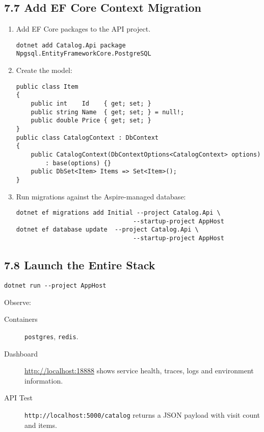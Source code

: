 \documentclass[table]{article}
\begin{document}
\subsection*{7.7 \faDatabase\enspace Add EF Core Context Migration}
\begin{enumerate}
  \item Add EF Core packages to the API project.  
\begin{verbatim}
dotnet add Catalog.Api package Npgsql.EntityFrameworkCore.PostgreSQL
\end{verbatim}
  \item Create the model:
\begin{verbatim}
public class Item
{
    public int    Id    { get; set; }
    public string Name  { get; set; } = null!;
    public double Price { get; set; }
}
public class CatalogContext : DbContext
{
    public CatalogContext(DbContextOptions<CatalogContext> options)
        : base(options) {}
    public DbSet<Item> Items => Set<Item>();
}
\end{verbatim}
  \item Run migrations against the Aspire-managed database:  
\begin{verbatim}
dotnet ef migrations add Initial --project Catalog.Api \
                                --startup-project AppHost
dotnet ef database update  --project Catalog.Api \
                                --startup-project AppHost
\end{verbatim}
\end{enumerate}

\subsection*{7.8 \faPlay\enspace Launch the Entire Stack}
\begin{verbatim}
dotnet run --project AppHost
\end{verbatim}
Observe:
\begin{description}
  \item[\faPlusCircle Containers] \texttt{postgres}, \texttt{redis}.
  \item[\faBug Dashboard]  \url{http://localhost:18888} shows service
        health, traces, logs and environment information.
  \item[\faEye API Test]  \verb|http://localhost:5000/catalog| returns a
        JSON payload with visit count and items.
\end{description}
\end{document}
